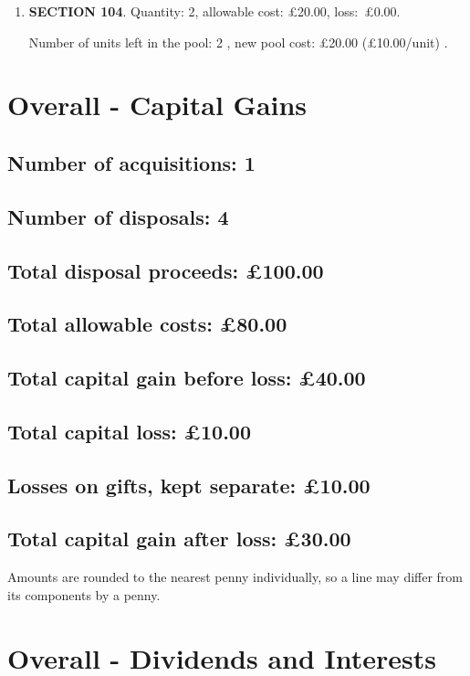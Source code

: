 \documentclass{article}
\begin{document}
\begin{enumerate}
\item \textbf{SECTION 104}. Quantity: 2,
    allowable
    cost:
    £20.00,
    \mbox{loss: £0.00.}

    Number of units left in the pool:
    2%
,
    new pool cost: £20.00
    (£10.00/unit)%
.

\end{enumerate}




\clearpage
\section*{Overall - Capital Gains}
\subsection*{Number of acquisitions: 1}
\subsection*{Number of disposals: 4}
\subsection*{Total disposal proceeds: £100.00}
\subsection*{Total allowable costs: £80.00}
\subsection*{Total capital gain before loss: £40.00}
\subsection*{Total capital loss: £10.00}
\subsection*{Losses on gifts, kept separate: £10.00}
\subsection*{Total capital gain after loss: £30.00}
\vspace{1em}
Amounts are rounded to the nearest penny individually, so a line may differ from its components by a penny.
\vspace{2em}
\section*{Overall - Dividends and Interests}
\end{document}

